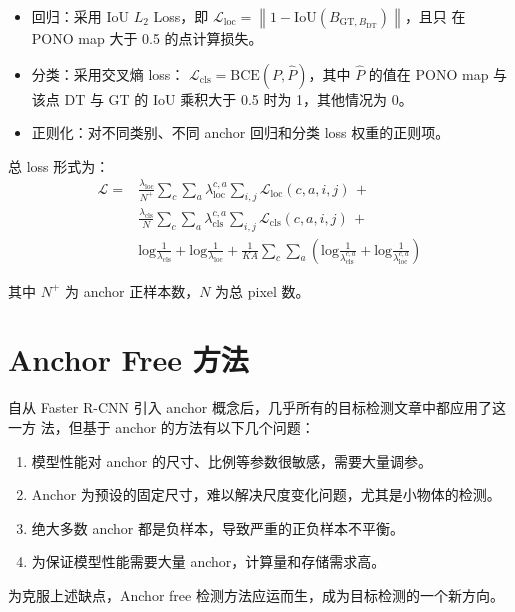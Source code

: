 \begin{itemize}
  \item 回归：采用 IoU $L_2$ Loss，即 $\mathcal{L}_{\mathrm{loc}} =
    \left \| 1 - \mathrm{IoU}(B_{\mathrm{GT}, B_{\mathrm{DT}}}) \right\|$，且只
    在 PONO map 大于 0.5 的点计算损失。
  \item 分类：采用交叉熵 loss：
    $\mathcal{L}_{\mathrm{cls}}=\mathrm{BCE}(P, \hat{P})$，其中 $\hat{P}$ 的值在
    PONO map 与该点 DT 与 GT 的 IoU 乘积大于 0.5 时为 1，其他情况为 0。
  \item 正则化：对不同类别、不同 anchor 回归和分类 loss 权重的正则项。
\end{itemize}

总 loss 形式为：
\begin{align}
  \mathcal{L} = & \frac{\lambda_{\mathrm{loc}}}{N^+}\sum_c \sum_a \lambda_{\mathrm{loc}}^{c,a} \sum_{i, j}\mathcal{L}_{\mathrm{loc}}(c,a,i,j) \, + \\
                & \frac{\lambda_{\mathrm{cls}}}{N}\sum_c \sum_a \lambda_{\mathrm{cls}}^{c,a} \sum_{i, j}\mathcal{L}_{\mathrm{cls}}(c,a,i,j) \, + \\
                & \mathrm{log}\frac{1}{\lambda_{\mathrm{cls}}} + \mathrm{log}\frac{1}{\lambda_{\mathrm{loc}}} + \frac{1}{KA}\sum_{c}\sum_{a}\left( \mathrm{log}\frac{1}{\lambda_{\mathrm{cls}}^{c,a}} + \mathrm{log}\frac{1}{\lambda_{\mathrm{loc}}^{c,a}} \right)
\end{align}

其中 $N^+$ 为 anchor 正样本数，$N$ 为总 pixel 数。

\chapter{Anchor Free 方法}
自从 Faster R-CNN 引入 anchor 概念后，几乎所有的目标检测文章中都应用了这一方
法，但基于 anchor 的方法有以下几个问题：

\begin{enumerate}
  \item 模型性能对 anchor 的尺寸、比例等参数很敏感，需要大量调参。
  \item Anchor 为预设的固定尺寸，难以解决尺度变化问题，尤其是小物体的检测。
  \item 绝大多数 anchor 都是负样本，导致严重的正负样本不平衡。
  \item 为保证模型性能需要大量 anchor，计算量和存储需求高。
\end{enumerate}

为克服上述缺点，Anchor free 检测方法应运而生，成为目标检测的一个新方向。

